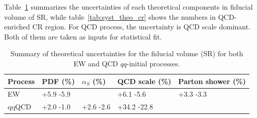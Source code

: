 Table~\ref{tab:syst_theo_sr} summarizes the uncertainties of each theoretical components in fiducial volume of SR,
while table~\ref{tab:syst_theo_cr} shows the numbers in QCD-enriched CR region.
For QCD process, the uncertainty is QCD scale dominant.
Both of them are taken as inputs for statistical fit.
\begin{table}[!htb]
\small
\begin{center}
\begin{tabular}{lllll} 
\hline\hline
Process     & PDF (\%)  & $\alpha_{S}$ (\%) & QCD scale (\%) & Parton shower (\%) \\
\hline
EW         & +5.9 -5.9 &                   & +6.1 -5.6      & +3.3 -3.3          \\
qqQCD      & +2.0 -1.0 & +2.6 -2.6         & +34.2 -22.8    &                    \\
\hline\hline
\end{tabular}
\caption{
Summary of theoretical uncertainties for the fiducial volume (SR) for both EW and QCD $qq$-initial processes.
}
\label{tab:syst_theo_sr}
\end{center}
\end{table}

